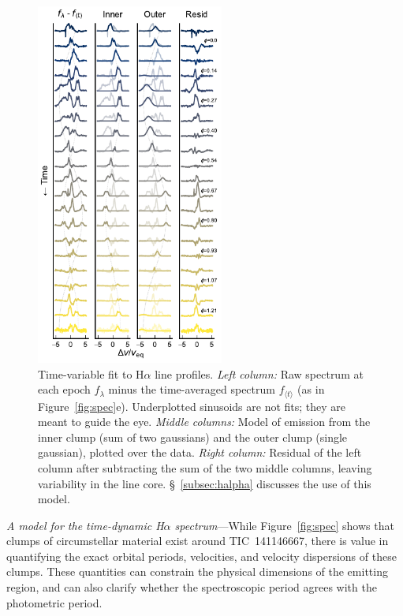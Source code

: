 \documentclass{nature3}
\begin{document}
\begin{methods}
\begin{figure}[!tp]
  \centering
  \includegraphics[width=0.55\textwidth]{figures/sf6.pdf}
  \caption{Time-variable fit to H$\alpha$ line profiles.  {\it Left
  column:} Raw spectrum at each epoch $f_{\lambda}$ minus the
  time-averaged spectrum $f_{\langle t \rangle}$ (as in
  Figure~\ref{fig:spec}e).  Underplotted sinusoids are not fits; they
  are meant to guide the eye.  {\it Middle columns:} Model of emission
  from the inner clump (sum of two gaussians) and the outer clump
  (single gaussian), plotted over the data.  {\it Right column:}
  Residual of the left column after subtracting the sum of the two
  middle columns, leaving variability in the line core.
  \S~\ref{subsec:halpha} discusses the use of this model.  }
  \label{fig:halphamodel}
\end{figure}

{\it A model for the time-dynamic H$\alpha$ spectrum}---While
Figure~\ref{fig:spec} shows that clumps of circumstellar material
exist around TIC~141146667, there is value in quantifying the exact
orbital periods, velocities, and velocity dispersions of these clumps.
These quantities can constrain the physical dimensions of the emitting
region, and can also clarify whether the spectroscopic period agrees
with the photometric period.


\end{methods}
\end{document}

